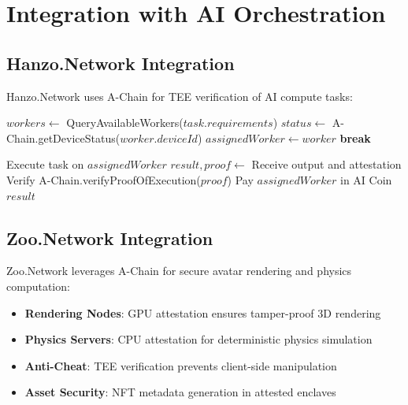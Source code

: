 \section{Integration with AI Orchestration}


\subsection{Hanzo.Network Integration}

Hanzo.Network uses A-Chain for TEE verification of AI compute tasks:

\begin{algorithm}[H]
\caption{Hanzo AI Task with TEE Verification}
\begin{algorithmic}[1]
    \State $workers \gets$ QueryAvailableWorkers($task.requirements$)
        \State $status \gets$ A-Chain.getDeviceStatus($worker.deviceId$)
            \State $assignedWorker \gets worker$
            \State \textbf{break}
        \EndIf
    \EndFor
    
    \State Execute task on $assignedWorker$
    \State $result, proof \gets$ Receive output and attestation
    \State Verify A-Chain.verifyProofOfExecution($proof$)
    \State Pay $assignedWorker$ in AI Coin
    \State \Return $result$
\EndFunction
\end{algorithmic}
\end{algorithm}

\subsection{Zoo.Network Integration}

Zoo.Network leverages A-Chain for secure avatar rendering and physics computation:

\begin{itemize}
\item \textbf{Rendering Nodes}: GPU attestation ensures tamper-proof 3D rendering
\item \textbf{Physics Servers}: CPU attestation for deterministic physics simulation
\item \textbf{Anti-Cheat}: TEE verification prevents client-side manipulation
\item \textbf{Asset Security}: NFT metadata generation in attested enclaves
\end{itemize}

